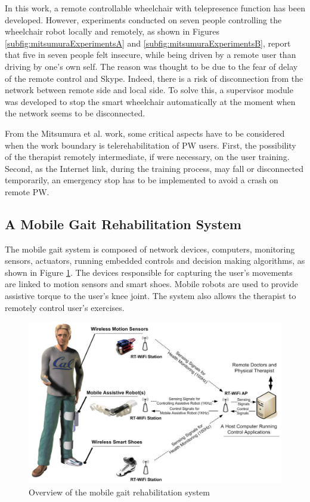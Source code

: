In this work, a remote controllable wheelchair with telepresence function has been developed. However, experiments conducted on seven people controlling the wheelchair robot locally and remotely, as shown in Figures \ref{subfig:mitsumuraExperimentsA} and \ref{subfig:mitsumuraExperimentsB}, report that five in seven people felt insecure, while being driven by a remote user than driving by one's own self. The reason was thought to be due to the fear of delay of the remote control and Skype. Indeed, there is a risk of disconnection from the network between remote side and local side. To solve this, a supervisor module was developed to stop the smart wheelchair automatically  at the moment when the network seems to be disconnected. 

From the Mitsumura et al. \cite{mitsumura2014} work, some critical aspects have to be considered when the work boundary is telerehabilitation of PW users. First, the possibility of the therapist remotely intermediate, if were necessary, on the user training. Second, as the Internet link, during the training process, may fall or disconnected temporarily, an emergency stop has to be implemented to avoid a crash on remote PW.  


\subsection{A Mobile Gait Rehabilitation System}
\label{subsec:wei2013}

The mobile gait system is composed of network devices, computers, monitoring sensors, actuators, running embedded controls and decision making algorithms, as shown in Figure \ref{fig:wei2013-mobileGaitOverview}. The devices responsible for capturing the user's movements are linked to motion sensors and smart shoes. Mobile robots are used to provide assistive torque to the user's knee joint. The system also allows the therapist to remotely control user's exercises.

\begin{figure}[!hbt]
\begin{center}
\includegraphics[width=0.9 \textwidth]{img/cap3/wei2013-mobileGaitOverview}
\caption{Overview of the mobile gait rehabilitation system \cite{wei2013}}
\label{fig:wei2013-mobileGaitOverview}
\end{center}
\end{figure}

